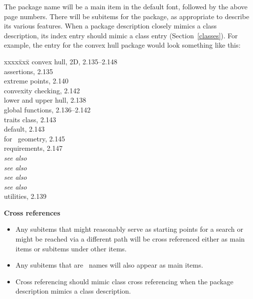 \documentclass{article}
\newenvironment{indexex}{\begin{tabbing}
xxxx\=xxx\=\kill}{\end{tabbing}}
\begin{document}
\begin{description}
        The package name will be a main item in the default font, followed 
        by the above page numbers.  There will be subitems for the package, 
        as appropriate
        to describe its various features.  When a package
        description closely mimics a class description, its index entry 
        should mimic a class entry (Section~\ref{classes}).  For example,
        the entry for the convex hull package would look something like
        this:
        \begin{indexex}
         convex hull, 2D,                                        2.135--2.148 \\
       \> assertions,                                            2.135  \\
       \> extreme points,                                        2.140  \\
       \> convexity checking,                                    2.142  \\
       \> lower and upper hull,                                  2.138  \\
       \> global functions,                                      2.136--2.142 \\
       \> traits class,                                          2.143  \\
       \>\> default,                                          2.143  \\
       \>\> for \leda\ geometry,                       2.145  \\
       \>\> requirements,                                    2.147  \\
          \>\> {\em see also} \\
          \>\> {\em see also} \\
          \>\> {\em see also} \\
          \>\> {\em see also} \\
       \> utilities,                                             2.139 \\
        \end{indexex}

   \item{\bf Cross references}

        \begin{itemize}
           \item Any subitems that might reasonably serve as starting points 
                 for a search or might be reached via a different path will
                 be cross referenced either as main items or subitems under
                 other items.
           \item Any subitems that are \CC\ names will also appear as main
                 items.
           \item Cross referencing should mimic class cross referencing
                 when the package description mimics a class description.
        \end{itemize}


\end{description}
\end{document}
